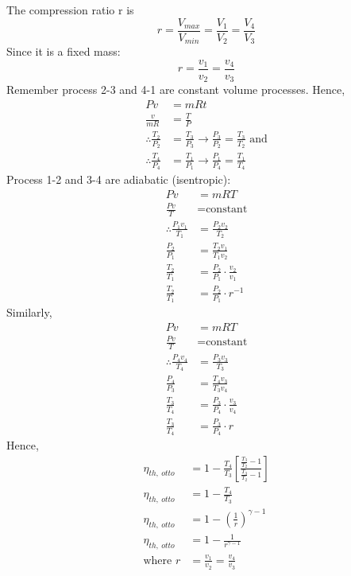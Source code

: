 \documentclass[class=report, crop=false, 12pt,a4paper]{standalone}
\begin{document}
The compression ratio r is
\begin{equation}
  r = \frac{V_{max}}{V_{min}} = \frac{V_1}{V_2} = \frac{V_4}{V_3}
\end{equation}
Since it is a fixed mass:
\begin{equation}
  r = \frac{v_1}{v_2} = \frac{v_4}{v_3}
\end{equation}
Remember process 2-3 and 4-1  are constant volume processes. Hence, 
\begin{align}
  Pv &= mRt\\
  \frac{v}{mR} &= \frac{T}{P}\\
  \therefore \frac{T_2}{P_2} &= \frac{T_3}{P_3} \rightarrow \frac{P_3}{P_2} = \frac{T_3}{T_2} \textrm{ and}\\
  \therefore \frac{T_4}{P_4} &= \frac{T_1}{P_1} \rightarrow \frac{P_1}{P_4} = \frac{T_1}{T_4}
\end{align}
Process 1-2 and 3-4 are adiabatic (isentropic):
\begin{align}
  Pv &= mRT\\
  \frac{Pv}{T} &= \textrm{constant}\\
  \therefore \frac{P_1 v_1}{T_1} &= \frac{P_2 v_2}{T_2}\\
  \frac{P_2}{P_1} &= \frac{T_2 v_1}{T_1 v_2}\\
  \frac{T_2}{T_1} &= \frac{P_2}{P_1} \cdot \frac{v_2}{v_1}\\
  \frac{T_2}{T_1} &= \frac{P_2}{P_1} \cdot r^{-1}
\end{align} 
Similarly,
\begin{align}
  Pv &= mRT\\
  \frac{Pv}{T} &= \textrm{constant}\\
  \therefore \frac{P_4 v_4}{T_4} &= \frac{P_3 v_3}{T_3}\\
  \frac{P_4}{P_3} &= \frac{T_4 v_3}{T_3 v_4}\\
  \frac{T_3}{T_4} &= \frac{P_3}{P_4} \cdot \frac{v_3}{v_4}\\
  \frac{T_3}{T_4} &= \frac{P_3}{P_4} \cdot r
\end{align} 
Hence,
\begin{align}
  \eta_{th, \ otto} &= 1 - \frac{T_4}{T_3}\left[ \frac{\frac{T_3}{T_2}- 1}{\frac{T_3}{T_2} -1} \right]\\
  \eta_{th, \ otto} &= 1 - \frac{T_4}{T_3}\\
  \eta_{th, \ otto} &= 1 - \left( \frac{1}{r} \right)^{\gamma -1}\\
  \eta_{th, \ otto} &= 1 - \frac{1}{r^{\gamma -1}}\\
  \textrm{where } r &= \frac{v_1}{v_2} = \frac{v_4}{v_3}
\end{align}
\end{document}
